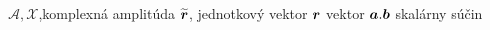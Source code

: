 
$\mathcal{A},\mathcal{X}$,komplexná amplitúda
$\widetilde{\boldsymbol{r}}$, jednotkový vektor
$\boldsymbol{r}$ vektor
$\boldsymbol{a}.\boldsymbol{b}$ skalárny súčin
